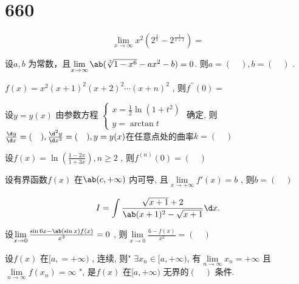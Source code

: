 \section{660}
\begin{question}
    \begin{equation*}
        \lim\limits_{x \to \infty} x^2 (2^{\frac{1}{x}} - 2^{\frac{1}{x + 1}}) = 
    \end{equation*}
\end{question}
\begin{question}
    设$ a, b $ 为常数，且$ \lim\limits_{x \to \infty} \ab(\sqrt[3]{1 - x^6} - ax^2 - b) = 0 $. 则$ a = (\quad), b = (\quad) $ . 
\end{question}
\begin{question}
    $ f(x) = x^2 (x + 1)^2 (x + 2)^2 \cdots (x + n)^2 $ , 则$ f^{\prime \prime}(0) =  $ 
\end{question}
\begin{question}
    设$ y = y(x) $ 由参数方程  $ 
    \begin{cases}
         x = \frac 1 2 \ln(1 + t^2)      \\
         y = \arctan t  
    \end{cases} $ 
    确定, 则$ \frac{\d y}{\d x} = (\quad) , \frac{\d^2 y}{\d x^2} = (\quad) , y = y(x) $在任意点处的曲率$ k = (\quad) $  
\end{question}
\begin{question}
    设$ f(x) = \ln(\frac{1 - 2x}{1 + 3x}), n \ge 2 $ , 则$ f^{(n)} (0) = (\quad) $ 
\end{question}
\begin{question}
    设有界函数$ f(x) $ 在$ \ab(c, +\infty) $ 内可导, 且$ \lim\limits_{x \to +\infty} f\prime(x) = b $ , 则$ b = (\quad) $ 
\end{question}
\begin{question}
    \begin{equation*}
        I = \int \frac{ \sqrt{x + 1} + 2 }{\ab(x + 1)^2 - \sqrt{x + 1}} \d x.
    \end{equation*}
\end{question}
\begin{question}
    设$ \lim\limits_{x \to 0} \frac{ \sin 6x - \ab(\sin x) f(x) }{ x^3 } = 0 $ , 则$ \lim\limits_{x \to 0} \frac{6 - f(x)}{x^2} = (\quad) $ 
\end{question}
\begin{question}
    设$ f(x) $ 在$ [a, = +\infty) $ , 连续, 则" $ \exists x_n \in [a, +\infty) $, 有$ \lim\limits_{n \to \infty} x_n = +\infty $ 且$ \lim\limits_{n \to \infty} f(x_n) = \infty $ ", 是$ f(x) $ 在$ [a, +\infty) $ 无界的$ (\quad) $ 条件.
\end{question}
